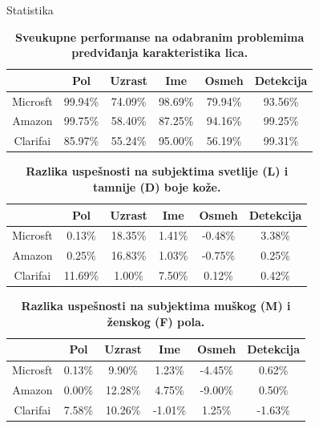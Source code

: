 \documentclass{beamer}
\begin{document}
	\begin{frame}{Statistika}
		\begin{table}[h!]
			\centering
			\caption{\textbf{Sveukupne performanse na odabranim problemima predviđanja karakteristika lica.}}
			\begin{tabular}{c|ccccc} \toprule
				{} & {Pol} & {Uzrast} & {Ime} & {Osmeh} & {Detekcija} \\ \midrule
				{Microsft} & 99.94\% & 74.09\% & 98.69\% & 79.94\% & 93.56\% \\ 
				{Amazon} & 99.75\% & 58.40\% & 87.25\% & 94.16\% & 99.25\% \\
				{Clarifai} & 85.97\% & 55.24\% & 95.00\% & 56.19\% & 99.31\%\\ \bottomrule
			\end{tabular}
		\end{table}
	\end{frame}

	\begin{frame}
		\begin{table}[h!]
			\centering
			\caption{\textbf{Razlika uspešnosti na subjektima svetlije (L) i tamnije (D) boje kože.}}
			\begin{tabular}{c|ccccc} \toprule
				{} & {Pol} & {Uzrast} & {Ime} & {Osmeh} & {Detekcija} \\ \midrule
				{Microsft} & 0.13\% & 18.35\% & 1.41\% & -0.48\% & 3.38\% \\ 
				{Amazon} & 0.25\% & 16.83\% & 1.03\% & -0.75\% & 0.25\% \\
				{Clarifai} & 11.69\% & 1.00\% & 7.50\% & 0.12\% & 0.42\%\\ \bottomrule
			\end{tabular}
			\label{table:unitary-color}
		\end{table}
	\end{frame}

	\begin{frame}
		\begin{table}[h!]
			\centering
			\caption{\textbf{Razlika uspešnosti na subjektima muškog (M) i ženskog (F) pola.}}
			\begin{tabular}{c|ccccc} \toprule
				{} & {Pol} & {Uzrast} & {Ime} & {Osmeh} & {Detekcija} \\ \midrule
				{Microsft} & 0.13\% & 9.90\% & 1.23\% & -4.45\% & 0.62\% \\ 
				{Amazon} & 0.00\% & 12.28\% & 4.75\% & -9.00\% & 0.50\% \\
				{Clarifai} & 7.58\% & 10.26\% & -1.01\% & 1.25\% & -1.63\%\\ \bottomrule
			\end{tabular}
			\label{table:unitary-gender}
		\end{table}
	\end{frame}
\end{document}
